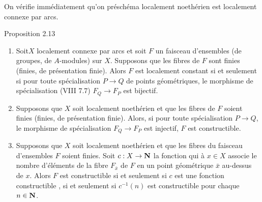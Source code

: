 \documentclass[10pt]{../fichiers-configuration-latex/smfart}
\begin{document}
On vérifie immédiatement qu'on préschéma localement noethérien est
localement connexe par arcs.

\begin{enonce*}{Proposition 2.13}
\begin{enumerate}
\renewcommand{\theenumi}{\roman{enumi}}
\renewcommand{\labelenumi}{(\theenumi)}
\item Soit\pageoriginale $X$ localement connexe par arcs et soit $F$
un faisceau d'ensembles (\resp de groupes, \resp de $A$-modules) sur
$X$. Supposons que les fibres de $F$ sont finies (\resp finies, \resp
de présentation finie). Alors $F$ est localement constant si et
seulement si pour toute spécialisation $P\rightarrow Q$ de points
géométriques, le morphisme de spécialisation {\rm (VIII 7.7)}
$F_Q\rightarrow F_P$ est bijectif.

\item Supposons que $X$ soit localement noethérien et que les fibres
de $F$ soient finies (\resp finies, \resp de présentation
finie). Alors, si pour toute spécialisation $P\rightarrow Q$, le
morphisme de spécialisation $F_Q\rightarrow F_P$ est injectif, $F$ est
constructible.

\item Supposons que $X$ soit localement noethérien et que les fibres
du faisceau d'ensembles $F$ soient finies. Soit $c:X\rightarrow
\mathbf{N}$ la fonction qui à $x\in X$ associe le nombre
d'éléments de la fibre $F_{\bar{x}}$ de $F$ en un point géométrique
$\bar{x}$ au-dessus de $x$. Alors $F$ est constructible si et seulement
si $c$ est une fonction constructible \ie, si et seulement si
$c^{-1}(n)$ est constructible pour chaque $n\in \mathbf{N}$.
\end{enumerate}
\end{enonce*}
\end{document}

